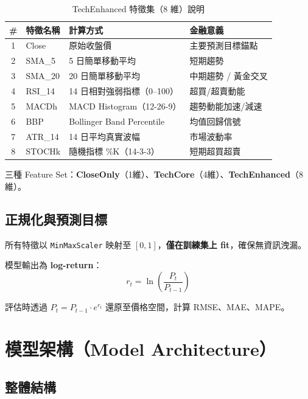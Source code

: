 \documentclass[12pt,a4paper]{article}
\begin{document}
\begin{table}[H]
\centering
\caption{TechEnhanced 特徵集（8 維）說明}
\begin{tabular}{clll}
\toprule
\textbf{\#} & \textbf{特徵名稱} & \textbf{計算方式} & \textbf{金融意義} \\
\midrule
1 & Close    & 原始收盤價                  & 主要預測目標錨點 \\
2 & SMA\_5   & 5 日簡單移動平均              & 短期趨勢 \\
3 & SMA\_20  & 20 日簡單移動平均             & 中期趨勢 / 黃金交叉 \\
4 & RSI\_14  & 14 日相對強弱指標（0–100）      & 超買/超賣動能 \\
5 & MACDh   & MACD Histogram（12-26-9）   & 趨勢動能加速/減速 \\
6 & BBP     & Bollinger Band Percentile   & 均值回歸信號 \\
7 & ATR\_14  & 14 日平均真實波幅              & 市場波動率 \\
8 & STOCHk  & 隨機指標 \%K（14-3-3）         & 短期超買超賣 \\
\bottomrule
\end{tabular}
\end{table}

三種 Feature Set：\textbf{CloseOnly}（1維）、\textbf{TechCore}（4維）、\textbf{TechEnhanced}（8維）。

\subsection{正規化與預測目標}

所有特徵以 \texttt{MinMaxScaler} 映射至 $[0,1]$，\textbf{僅在訓練集上 fit}，確保無資訊洩漏。

模型輸出為 \textbf{log-return}：
\begin{equation}
  r_t = \ln\!\left(\frac{P_t}{P_{t-1}}\right)
\end{equation}

評估時透過 $P_t = P_{t-1} \cdot e^{r_t}$ 還原至價格空間，計算 RMSE、MAE、MAPE。

\section{模型架構（Model Architecture）}

\subsection{整體結構}
\end{document}
